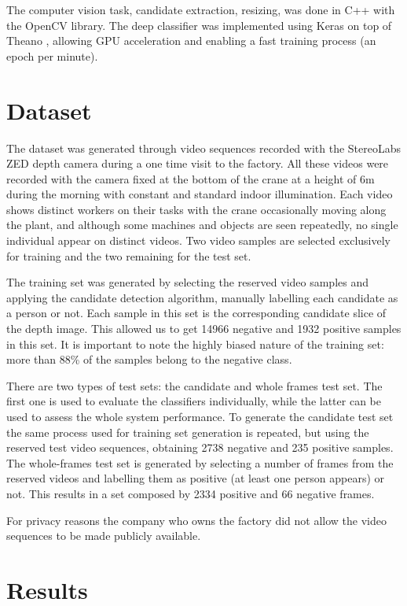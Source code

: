         The computer vision task, candidate extraction, resizing, was done in C++ with the OpenCV library. The deep classifier was implemented using Keras \cite{keras} on top of Theano \cite{theano}, allowing GPU acceleration and enabling a fast training process (an epoch per minute).

\section{Dataset}
\label{sec:dataset}
The dataset was generated through video sequences recorded with the StereoLabs ZED depth camera during a one time visit to the factory. All these videos were recorded with the camera fixed at the bottom of the crane at a height of 6m during the morning with constant and standard indoor illumination. Each video shows distinct workers on their tasks with the crane occasionally moving along the plant, and although some machines and objects are seen repeatedly, no single individual appear on distinct videos. Two video samples are selected exclusively for training and the two remaining for the test set.

The training set was generated by selecting the reserved video samples and applying the candidate detection algorithm, manually labelling each candidate as a person or not. Each sample in this set is the corresponding candidate slice of the depth image. This allowed us to get 14966 negative and 1932 positive samples in this set. It is important to note the highly biased nature of the training set: more than 88\% of the samples belong to the negative class.

There are two types of test sets: the candidate and whole frames test set. The first one is used to evaluate the classifiers individually, while the latter can be used to assess the whole system performance. To generate the candidate test set the same process used for training set generation is repeated, but using the reserved test video sequences, obtaining 2738 negative and 235 positive samples. The whole-frames test set is generated by selecting a number of frames from the reserved videos and labelling them as positive (at least one person appears) or not. This results in a set composed by 2334 positive and 66 negative frames.

For privacy reasons the company who owns the factory did not allow the video sequences to be made publicly available.

\section{Results}
\label{sec:results}

